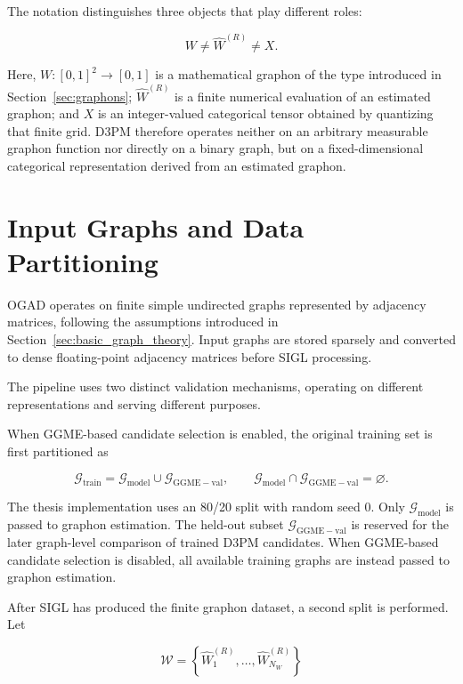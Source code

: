 The notation distinguishes three objects that play different roles:

\[
W
\neq
\widehat{W}^{(R)}
\neq
X.
\]

Here, \(W:[0,1]^2\rightarrow[0,1]\) is a mathematical graphon of the type introduced in Section~\ref{sec:graphons}; \(\widehat{W}^{(R)}\) is a finite numerical evaluation of an estimated graphon; and \(X\) is an integer-valued categorical tensor obtained by quantizing that finite grid. D3PM therefore operates neither on an arbitrary measurable graphon function nor directly on a binary graph, but on a fixed-dimensional categorical representation derived from an estimated graphon.



\section{Input Graphs and Data Partitioning}
\label{sec:method_input_partitioning}

OGAD operates on finite simple undirected graphs represented by adjacency matrices, following the assumptions introduced in Section~\ref{sec:basic_graph_theory}. Input graphs are stored sparsely and converted to dense floating-point adjacency matrices before SIGL processing.

The pipeline uses two distinct validation mechanisms, operating on different representations and serving different purposes.

When GGME-based candidate selection is enabled, the original training set is first partitioned as

\[
\mathcal{G}_{\mathrm{train}}
=
\mathcal{G}_{\mathrm{model}}
\cup
\mathcal{G}_{\mathrm{GGME-val}},
\qquad
\mathcal{G}_{\mathrm{model}}
\cap
\mathcal{G}_{\mathrm{GGME-val}}
=
\varnothing.
\]

The thesis implementation uses an 80/20 split with random seed \(0\). Only $\mathcal{G}_{\mathrm{model}}$ is passed to graphon estimation. The held-out subset $\mathcal{G}_{\mathrm{GGME-val}}$ is reserved for the later graph-level comparison of trained D3PM candidates. When GGME-based candidate selection is disabled, all available training graphs are instead passed to graphon estimation.

After SIGL has produced the finite graphon dataset, a second split is performed. Let

\[
\mathcal{W}
=
\left\{
\widehat{W}^{(R)}_1,
\ldots,
\widehat{W}^{(R)}_{N_W}
\right\}
\]

